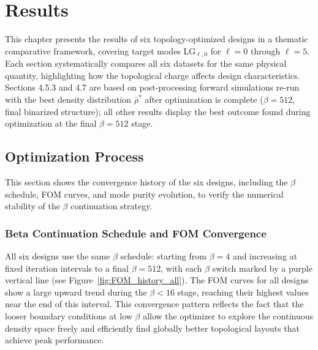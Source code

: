 \chapter{Results}

\label{ch:Results}

This chapter presents the results of six topology-optimized designs in a thematic comparative framework, covering target modes LG$_{\ell,0}$ for $\ell = 0$ through $\ell = 5$. Each section systematically compares all six datasets for the same physical quantity, highlighting how the topological charge affects design characteristics. Sections 4.5.3 and 4.7 are based on post-processing forward simulations re-run with the best density distribution $\bar{\rho}^{*}$ after optimization is complete ($\beta = 512$, final binarized structure); all other results display the best outcome found during optimization at the final $\beta = 512$ stage.



\section{Optimization Process}

\label{sec:opt_process}

This section shows the convergence history of the six designs, including the $\beta$ schedule, FOM curves, and mode purity evolution, to verify the numerical stability of the $\beta$ continuation strategy.

\subsection{Beta Continuation Schedule and FOM Convergence}

\label{ssec:opt_FOM}

All six designs use the same $\beta$ schedule: starting from $\beta = 4$ and increasing at fixed iteration intervals to a final $\beta = 512$, with each $\beta$ switch marked by a purple vertical line (see Figure~\ref{fig:FOM_history_all}). The FOM curves for all designs show a large upward trend during the $\beta < 16$ stage, reaching their highest values near the end of this interval. This convergence pattern reflects the fact that the looser boundary conditions at low $\beta$ allow the optimizer to explore the continuous density space freely and efficiently find globally better topological layouts that achieve peak performance.

